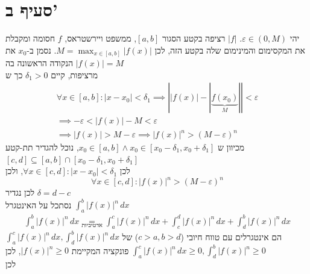 \documentclass[12pt, titlepage]{article}
\begin{document}
\section*{סעיף ב'}
יהי $\varepsilon\in \left( 0,M \right)$. $\left| f \right|$ רציפה בקטע הסגור $\left[ a,b \right]$, ממשפט ויירשטראס, $f$ חסומה ומקבלת את המקסימום והמינימום שלה בקטע הזה, לכן $M=\max_{x \in \left[ a,b \right]}\left| f\left( x \right) \right|$. נסמן ב-$x_{0}$ את הנקודה הראשונה בה $\left| f\left( x \right) \right|=M$\\
מרציפות, קיים $\delta_{1}>0$ כך ש 
\begin{gather*}
	\forall x \in \left[ a,b\right] : \left| x-x_{0} \right| <\delta_{1} \implies \left| \left| f\left( x \right)  \right|  -\left| \underbrace{ f\left( x_{0} \right) }_{ M }  \right|   \right| <\varepsilon  \\
	\implies  -\varepsilon<\left| f\left( x \right)  \right|  -M<\varepsilon \\
	\implies \left| f\left( x \right)  \right| > M-\varepsilon \implies \left| f\left( x \right)  \right| ^{n}>\left( M-\varepsilon \right) ^{n}
\end{gather*}
מכיוון ש $x_{0}\in \left[ a,b \right]\land x_{0}\in \left[ x_{0}-\delta_{1},x_{0}+\delta_{1} \right]$, נוכל להגדיר תת-קטע $\left[ c,d \right]\subseteq \left[ a,b \right]\cap \left[ x_{0}-\delta_{1},x_{0}+\delta_{1} \right]$\\
לכן $\forall x \in \left[c,d \right] :  \left| x-x_{0} \right| <\delta_{1}$, ולכן
$$
	\forall x \in \left[ c,d \right] : \left| f\left( x \right)  \right| ^{n}>\left( M-\varepsilon \right) ^{n}
$$
לכן נגדיר $\delta=d-c$\\
נסתכל על האינטגרל $\int_{a}^{b} \left| f\left( x \right) \right|^{n} \, dx$
\begin{gather*}
	\int_{a}^{b} \left| f\left( x \right)  \right| ^{n} \, dx \underset{ \text{אדטיביות} }{ = } \int_{a}^{c} \left| f\left( x \right)  \right| ^{n} \, dx  + \int_{c}^{d} \left| f\left( x \right)  \right|^{n}  \, dx  + \int_{d}^{b} \left| f\left( x \right)  \right| ^{n} \, dx  
\end{gather*}
$\int_{a}^{c} \left| f\left( x \right) \right|^{n} \, dx,\int_{d}^{b} \left| f\left( x \right) \right|^{n} \, dx$ הם אינטגרלים עם טווח חיובי ($c>a,b>d$) של פונקציה המקיימת $\left| f\left( x \right) \right|^{n}\geq0$, לכן $\int_{a}^{c} \left| f\left( x \right) \right|^{n} \, dx\geq 0,\int_{d}^{b} \left| f\left( x \right) \right|^{n}\geq 0$\\
לכן
\end{document}
